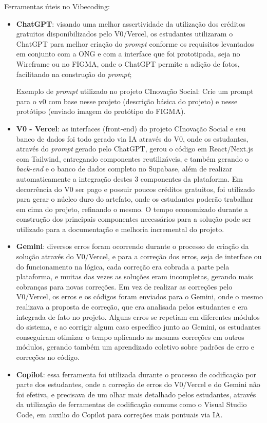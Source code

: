 Ferramentas úteis no Vibecoding:
\begin{itemize}
    \item \textbf{ChatGPT}: visando uma melhor assertividade da utilização dos créditos gratuitos disponibilizados pelo V0/Vercel, os estudantes utilizaram o ChatGPT para melhor criação do \textit{prompt} conforme os requisitos levantados em conjunto com a ONG e com a interface que foi prototipada, seja no Wireframe ou no FIGMA, onde o ChatGPT permite a adição de fotos, facilitando na construção do \textit{prompt};

    Exemplo de \textit{prompt} utilizado no projeto CInovação Social: Crie um prompt para o v0 com base nesse projeto (descrição básica do projeto) e nesse protótipo (enviado imagem do protótipo do FIGMA).
    
    \item \textbf{V0 - Vercel}: as interfaces (front-end) do projeto CInovação Social e seu banco de dados foi todo gerado via IA através do V0, onde os estudantes, através do \textit{prompt} gerado pelo ChatGPT, gerou o código em React/Next.js com Tailwind, entregando componentes reutilizáveis, e também gerando o \textit{back-end} e o banco de dados completo no Supabase, além de realizar automaticamente a integração destes 3 componentes da plataforma. Em decorrência do V0 ser pago e possuir poucos créditos gratuitos, foi utilizado para gerar o núcleo duro do artefato, onde os estudantes poderão trabalhar em cima do projeto, refinando o mesmo. O tempo economizado durante a construção dos principais componentes necessários para a solução pode ser utilizado para a documentação e melhoria incremental do projeto.
    
    \item \textbf{Gemini}: diversos erros foram ocorrendo durante o processo de criação da solução através do V0/Vercel, e para a correção dos erros, seja de interface ou do funcionamento na lógica, cada correção era cobrada a parte pela plataforma, e muitas das vezes as soluções eram incompletas, gerando mais cobranças para novas correções. Em vez de realizar as correções pelo V0/Vercel, os erros e os códigos foram enviados para o Gemini, onde o mesmo realizava a proposta de correção, que era analisada pelos estudantes e era integrada de fato no projeto. Alguns erros se repetiam em diferentes módulos do sistema, e ao corrigir algum caso específico junto ao Gemini, os estudantes conseguiram otimizar o tempo aplicando as mesmas correções em outros módulos, gerando também um aprendizado coletivo sobre padrões de erro e correções no código.
    
    \item \textbf{Copilot}: essa ferramenta foi utilizada durante o processo de codificação por parte dos estudantes, onde a correção de erros do V0/Vercel e do Gemini não foi efetiva, e precisava de um olhar mais detalhado pelos estudantes, através da utilização de ferramentas de codificação comuns como o Visual Studio Code, em auxilio do Copilot para correções mais pontuais via IA.
\end{itemize}
